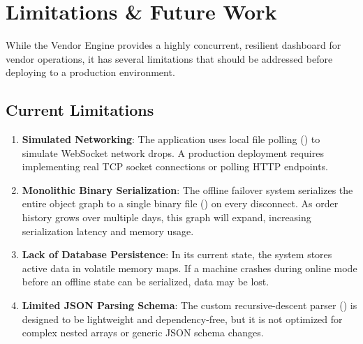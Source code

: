 
\section{Limitations \& Future Work}
\label{sec:limitations}

While the Vendor Engine provides a highly concurrent, resilient dashboard for vendor operations, it has several limitations that should be addressed before deploying to a production environment.

\subsection{Current Limitations}
\begin{enumerate}
    \item \textbf{Simulated Networking}: The application uses local file polling () to simulate WebSocket network drops. A production deployment requires implementing real TCP socket connections or polling HTTP endpoints.
    \item \textbf{Monolithic Binary Serialization}: The offline failover system serializes the entire  object graph to a single binary file () on every disconnect. As order history grows over multiple days, this graph will expand, increasing serialization latency and memory usage.
    \item \textbf{Lack of Database Persistence}: In its current state, the system stores active data in volatile memory maps. If a machine crashes during online mode before an offline state can be serialized, data may be lost.
    \item \textbf{Limited JSON Parsing Schema}: The custom recursive-descent parser () is designed to be lightweight and dependency-free, but it is not optimized for complex nested arrays or generic JSON schema changes.
\end{enumerate}


